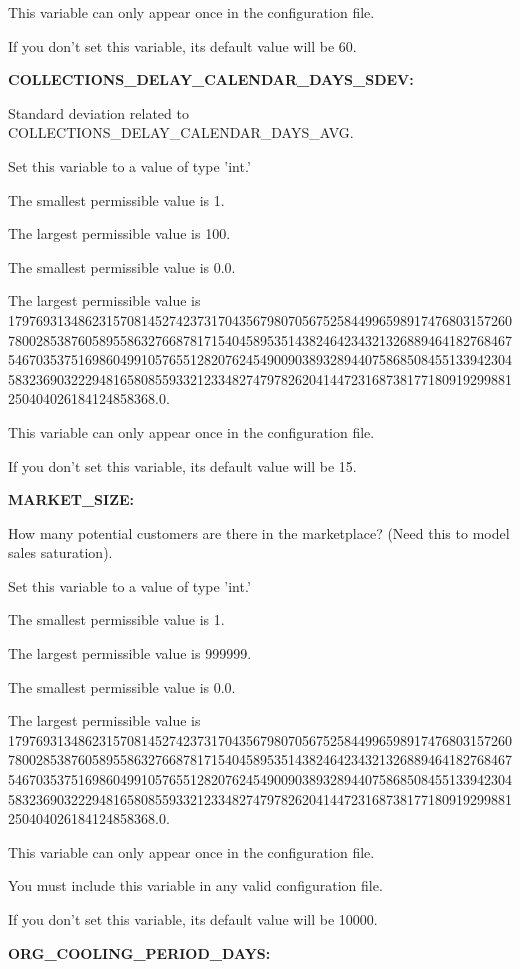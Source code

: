 This variable can only appear once in the configuration file.

If you don't set this variable, its default value will be 60.


\textbf{COLLECTIONS\_DELAY\_CALENDAR\_DAYS\_SDEV:}


Standard deviation related to COLLECTIONS\_DELAY\_CALENDAR\_DAYS\_AVG.

Set this variable to a value of type 'int.'

The smallest permissible value is 1.

The largest permissible value is 100.

The smallest permissible value is 0.0.

The largest permissible value is 179769313486231570814527423731704356798070567525844996598917476803157260780028538760589558632766878171540458953514382464234321326889464182768467546703537516986049910576551282076245490090389328944075868508455133942304583236903222948165808559332123348274797826204144723168738177180919299881250404026184124858368.0.

This variable can only appear once in the configuration file.

If you don't set this variable, its default value will be 15.


\textbf{MARKET\_SIZE:}


How many potential customers are there in the marketplace?  (Need this to model sales saturation).

Set this variable to a value of type 'int.'

The smallest permissible value is 1.

The largest permissible value is 999999.

The smallest permissible value is 0.0.

The largest permissible value is 179769313486231570814527423731704356798070567525844996598917476803157260780028538760589558632766878171540458953514382464234321326889464182768467546703537516986049910576551282076245490090389328944075868508455133942304583236903222948165808559332123348274797826204144723168738177180919299881250404026184124858368.0.

This variable can only appear once in the configuration file.

You must include  this variable in any valid configuration file.

If you don't set this variable, its default value will be 10000.


\textbf{ORG\_COOLING\_PERIOD\_DAYS:}


